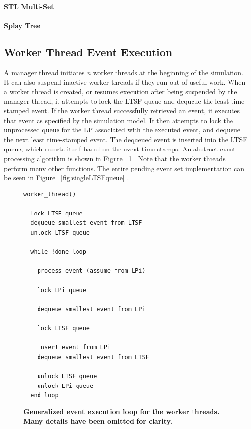 \documentclass[11pt]{book}
\begin{document}
\paragraph{STL Multi-Set}


\paragraph{Splay Tree}

\subsection{Worker Thread Event Execution}

A manager thread initiates \textit{n} worker threads at the beginning of the simulation.
It can also suspend inactive worker threads if they run out of useful work.  When a worker
thread is created, or resumes execution after being suspended by the manager thread, it
attempts to lock the LTSF queue and dequeue the least time-stamped event.  If the worker
thread successfully retrieved an event, it executes that event as specified by the
simulation model.  It then attempts to lock the unprocessed queue for the LP associated
with the executed event, and dequeue the next least time-stamped event.  The dequeued
event is inserted into the LTSF queue, which resorts itself based on the event
time-stamps.  An abstract event processing algorithm is shown in Figure
~\ref{workerThreadAlgorithm} \cite{dickman}.  Note that the worker threads perform many
other functions.  The entire pending event set implementation can be seen in Figure
~\ref{fig:singleLTSFqueue} \cite{dickman}.

\linespread{1.0}
\begin{figure}
\begin{verbatim}
worker_thread()

  lock LTSF queue
  dequeue smallest event from LTSF
  unlock LTSF queue

  while !done loop

    process event (assume from LPi)

    lock LPi queue 

    dequeue smallest event from LPi

    lock LTSF queue

    insert event from LPi
    dequeue smallest event from LTSF

    unlock LTSF queue
    unlock LPi queue
  end loop
\end{verbatim}
\caption{\textbf{Generalized event execution loop for the worker threads.  Many details
    have been omitted for clarity.}}\label{workerThreadAlgorithm}
\end{figure}
\end{document}
